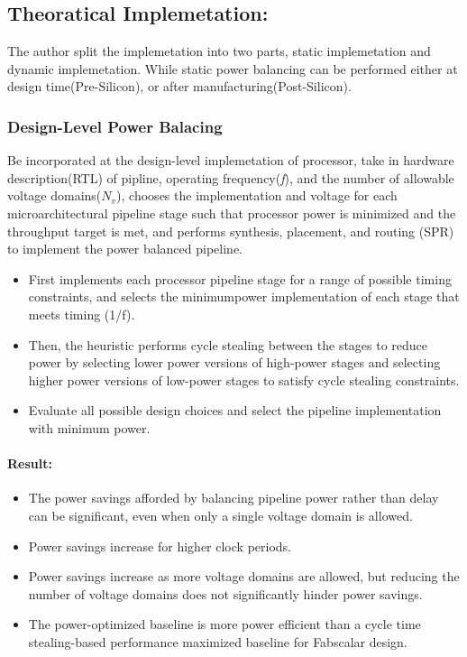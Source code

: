 \documentclass[10pt,a4paper]{article}
\begin{document}
\subsection{Theoratical Implemetation:}
The author split the implemetation into two parts, static implemetation and dynamic implemetation. While static power balancing can be performed either at design time(Pre-Silicon), or after manufacturing(Post-Silicon).

\subsubsection{Design-Level Power Balacing}
Be incorporated at the design-level implemetation of processor, take in hardware description(RTL) of pipline, operating frequency(\emph{f}), and the number of allowable voltage domains($N_{v}$), chooses the implementation and voltage for each microarchitectural pipeline stage such that processor power is minimized and the throughput target is met, and performs synthesis, placement, and routing (SPR) to implement the power balanced pipeline. \\
\begin{itemize}
	\item First implements each processor pipeline stage for a range of possible timing constraints, and selects the minimumpower implementation of each stage that meets timing
    (1/f). 
	\item Then, the heuristic performs cycle stealing between the stages to reduce power by selecting lower power versions of high-power stages and selecting higher power versions of low-power stages to satisfy cycle stealing constraints.
	\item Evaluate all possible design choices and select the pipeline implementation
    with minimum power. 
\end{itemize}
\paragraph{Result:} 
\begin{itemize}
    \item The power savings afforded by balancing pipeline power rather than delay can be significant, even when only a single voltage domain is allowed.
    \item Power savings increase for higher clock periods.
    \item Power savings increase as more voltage domains are allowed, but reducing the number of voltage
    domains does not significantly hinder power savings.
    \item  The power-optimized baseline is more power efficient than a cycle time stealing-based performance maximized baseline for Fabscalar design.
\end{itemize}
\end{document}
